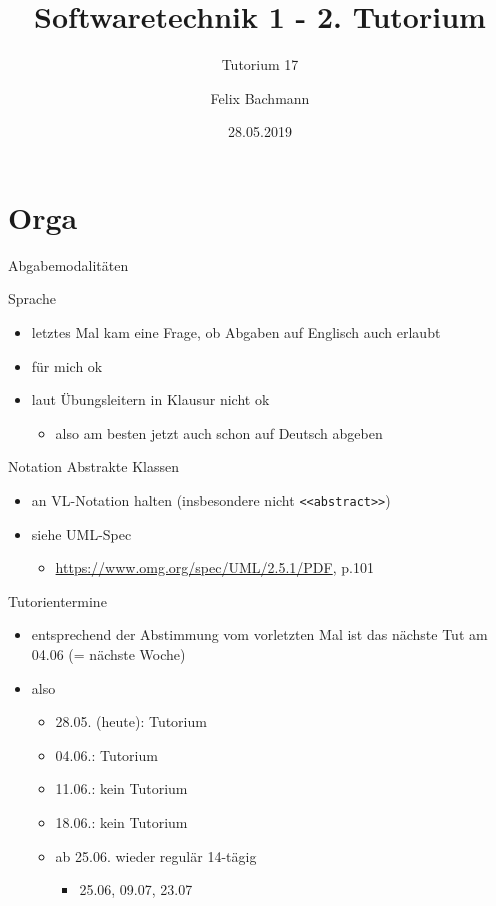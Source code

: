 \documentclass[18pt]{beamer}
\title[SWT1]{Softwaretechnik 1 - 2. Tutorium}
\subtitle{Tutorium 17}
\author{Felix Bachmann}
\date{28.05.2019}
\institute{KIT - Institut für Programmstrukturen und Datenorganisation (IPD)}
\begin{document}

\begin{frame}
\titlepage
\end{frame}

\section{Orga}
\begin{frame}[fragile]{Abgabemodalitäten}
	\begin{block}{Sprache}
		\begin{itemize}
			\item letztes Mal kam eine Frage, ob Abgaben auf Englisch auch erlaubt
			\item für mich ok
			\item laut Übungsleitern in Klausur nicht ok
			\begin{itemize}
				\item also am besten jetzt auch schon auf Deutsch abgeben
			\end{itemize}
		\end{itemize}
	\end{block}
	\begin{block}{Notation Abstrakte Klassen}
		\begin{itemize}
			\item an VL-Notation halten (insbesondere nicht \verb|<<abstract>>|)
			\item siehe UML-Spec 
			\begin{itemize}
				\item \url{https://www.omg.org/spec/UML/2.5.1/PDF}, p.101
			\end{itemize}
		\end{itemize}
	\end{block}
\end{frame}

\begin{frame}{Tutorientermine}
	\begin{itemize}
		\item entsprechend der Abstimmung vom vorletzten Mal ist das nächste Tut am 04.06 (= nächste Woche)
		\item also
		\begin{itemize}
			\item 28.05. (heute): Tutorium
			\item 04.06.: Tutorium
			\item 11.06.: kein Tutorium
			\item 18.06.: kein Tutorium
			\item ab 25.06. wieder regulär 14-tägig
			\begin{itemize}
				\item 25.06, 09.07, 23.07
			\end{itemize}
		\end{itemize}
	\end{itemize}
\end{frame}
\end{document}
